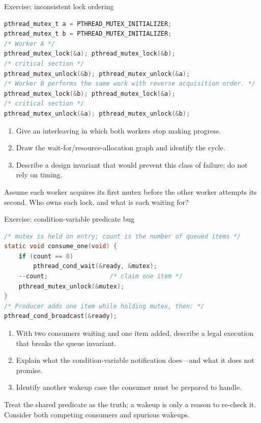 \documentclass[aspectratio=169,11pt]{beamer}
\begin{document}
\begin{frame}[fragile]{Exercise: inconsistent lock ordering}
  \scriptsize
\begin{lstlisting}[language=C]
pthread_mutex_t a = PTHREAD_MUTEX_INITIALIZER;
pthread_mutex_t b = PTHREAD_MUTEX_INITIALIZER;
/* Worker A */
pthread_mutex_lock(&a); pthread_mutex_lock(&b);
/* critical section */
pthread_mutex_unlock(&b); pthread_mutex_unlock(&a);
/* Worker B performs the same work with reverse acquisition order. */
pthread_mutex_lock(&b); pthread_mutex_lock(&a);
/* critical section */
pthread_mutex_unlock(&a); pthread_mutex_unlock(&b);
\end{lstlisting}
  \begin{enumerate}
    \item Give an interleaving in which both workers stop making progress.
    \item Draw the wait-for/resource-allocation graph and identify the cycle.
    \item Describe a design invariant that would prevent this class of failure; do not rely on timing.
  \end{enumerate}
  \begin{tcolorbox}[title=Hint,colback=osorange!5,colframe=osorange!70]
    Assume each worker acquires its first mutex before the other worker attempts its second. Who owns each lock, and what is each waiting for?
  \end{tcolorbox}
\end{frame}

\begin{frame}[fragile]{Exercise: condition-variable predicate bug}
  \scriptsize
\begin{lstlisting}[language=C]
/* mutex is held on entry; count is the number of queued items */
static void consume_one(void) {
    if (count == 0)
        pthread_cond_wait(&ready, &mutex);
    --count;                 /* claim one item */
    pthread_mutex_unlock(&mutex);
}
/* Producer adds one item while holding mutex, then: */
pthread_cond_broadcast(&ready);
\end{lstlisting}
  \begin{enumerate}
    \item With two consumers waiting and one item added, describe a legal execution that breaks the queue invariant.
    \item Explain what the condition-variable notification does—and what it does not promise.
    \item Identify another wakeup case the consumer must be prepared to handle.
  \end{enumerate}
  \begin{tcolorbox}[title=Hint,colback=osorange!5,colframe=osorange!70]
    Treat the shared predicate as the truth; a wakeup is only a reason to re-check it. Consider both competing consumers and spurious wakeups.
  \end{tcolorbox}
\end{frame}
\end{document}

